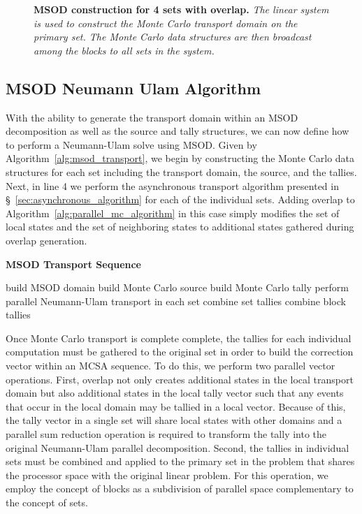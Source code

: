 \begin{figure}[t!]
  \begin{center}
    \scalebox{0.6}{  }
  \end{center}
  \caption{\textbf{MSOD construction for 4 sets with overlap.}
    \textit{The linear system is used to construct the Monte Carlo
      transport domain on the primary set. The Monte Carlo data
      structures are then broadcast among the blocks to all sets in
      the system.}}
  \label{fig:msod_construction}
\end{figure}

\clearpage

\subsection{MSOD Neumann Ulam Algorithm }
\label{subsec:msod_algorithm}

With the ability to generate the transport domain within an MSOD
decomposition as well as the source and tally structures, we can now
define how to perform a Neumann-Ulam solve using MSOD. Given by
Algorithm~\ref{alg:msod_transport}, we begin by constructing the Monte
Carlo data structures for each set including the transport domain, the
source, and the tallies. Next, in line 4 we perform the asynchronous
transport algorithm presented in \S~\ref{sec:asynchronous_algorithm}
for each of the individual sets. Adding overlap to
Algorithm~\ref{alg:parallel_mc_algorithm} in this case simply modifies
the set of local states and the set of neighboring states to
additional states gathered during overlap generation.

\begin{algorithm}[h!]
  \caption{\textbf{MSOD Transport Sequence}}
  \label{alg:msod_transport}
  \begin{algorithmic}[1]
    \State build MSOD domain
    \State build Monte Carlo source
    \State build Monte Carlo tally
    \State perform parallel Neumann-Ulam transport in each set
    \State combine set tallies
    \State combine block tallies
  \end{algorithmic}
\end{algorithm}

Once Monte Carlo transport is complete complete, the tallies for each
individual computation must be gathered to the original set in order
to build the correction vector within an MCSA sequence. To do this, we
perform two parallel vector operations. First, overlap not only
creates additional states in the local transport domain but also
additional states in the local tally vector such that any events that
occur in the local domain may be tallied in a local vector. Because of
this, the tally vector in a single set will share local states with
other domains and a parallel sum reduction operation is required to
transform the tally into the original Neumann-Ulam parallel
decomposition. Second, the tallies in individual sets must be combined
and applied to the primary set in the problem that shares the
processor space with the original linear problem. For this operation,
we employ the concept of blocks as a subdivision of parallel space
complementary to the concept of sets.

